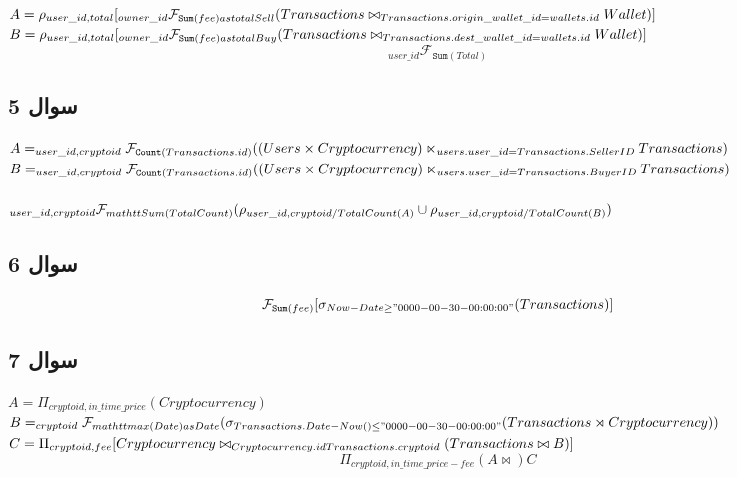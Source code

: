 \documentclass{book}
\begin{document}
$A = \rho_{user\_id, total}[ _{owner\_id} \mathcal{F}_{\mathtt{Sum}(fee) as totalSell} \newline(
    Transactions \bowtie_{Transactions.origin\_wallet\_id = wallets.id} Wallet
    )]$\\
$B = \rho_{user\_id, total}[ _{owner\_id} \mathcal{F}_{\mathtt{Sum}(fee) as totalBuy} \newline(
    Transactions \bowtie_{Transactions.dest\_wallet\_id = wallets.id} Wallet
    )]$
$$_{user\_id}\mathcal{F}_{\mathtt{Sum}(Total)}$$


\subsection{سوال 5}

$A = _{user\_id, cryptoid} \mathcal{F}_{\mathtt{Count}(Transactions.id)}(\\(Users \times Cryptocurrency) \ltimes_{users.user\_id = Transactions.SellerID} \\Transactions)$\\

$B = _{user\_id, cryptoid} \mathcal{F}_{\mathtt{Count}(Transactions.id)}(\\(Users \times Cryptocurrency) \ltimes_{users.user\_id = Transactions.BuyerID}\\ Transactions)$\\
\quad\\
$_{user\_id, cryptoid} \mathcal{F}_{mathtt{Sum}(TotalCount)} (\\\rho_{user\_id, cryptoid/ TotalCount(A)} \cup \rho_{user\_id, cryptoid/ TotalCount(B)} )$

\subsection{سوال 6}
$$\mathcal{F}_{\mathtt{Sum}(fee)}[\sigma_{Now-Date \geq "0000-00-30-00:00:00"}(Transactions)]$$

\subsection{سوال 7}

\begin{latin}

    $A= \Pi_{cryptoid, in\_time\_price} (Cryptocurrency)$\\
    $B=_{cryptoid} \mathcal{F}_{mathtt{max}(Date) as Date} (\\\sigma_{Transactions.Date - Now() \leq "0000-00-30-00:00:00"}(Transactions \rtimes Cryptocurrency))$\\
    $C = \Pi_{cryptoid,fee} [Cryptocurrency \bowtie_{Cryptocurrency.id Transactions.cryptoid} (\\Transactions \bowtie B)]$
    $$\Pi_{cryptoid, in\_time\_price - fee} (A \bowtie) C$$
\end{latin}
\end{document}
